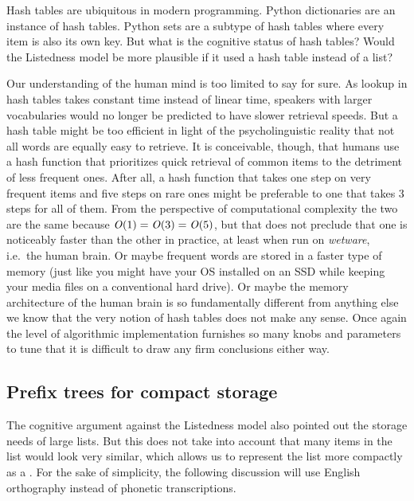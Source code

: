 \begin{programming}
Hash tables are ubiquitous in modern programming.
Python dictionaries are an instance of hash tables.
Python sets are a subtype of hash tables where every item is also its own key.
But what is the cognitive status of hash tables?
Would the Listedness model be more plausible if it used a hash table instead of a list?

Our understanding of the human mind is too limited to say for sure.
As lookup in hash tables takes constant time instead of linear time, speakers with larger vocabularies would no longer be predicted to have slower retrieval speeds.
But a hash table might be too efficient in light of the psycholinguistic reality that not all words are equally easy to retrieve.
It is conceivable, though, that humans use a hash function that prioritizes quick retrieval of common items to the detriment of less frequent ones.
After all, a hash function that takes one step on very frequent items and five steps on rare ones might be preferable to one that takes 3 steps for all of them.
From the perspective of computational complexity the two are the same because $\mathit{O}(1) = \mathit{O}(3) = \mathit{O}(5)$, but that does not preclude that one is noticeably faster than the other in practice, at least when run on \emph{wetware}, i.e.\ the human brain.
Or maybe frequent words are stored in a faster type of memory (just like you might have your OS installed on an SSD while keeping your media files on a conventional hard drive).
Or maybe the memory architecture of the human brain is so fundamentally different from anything else we know that the very notion of hash tables does not make any sense.
Once again the level of algorithmic implementation furnishes so many knobs and parameters to tune that it is difficult to draw any firm conclusions either way.


\subsection{Prefix trees for compact storage}
\label{ssec:listphonology_code_prefixtrees}

The cognitive argument against the Listedness model also pointed out the storage needs of large lists.
But this does not take into account that many items in the list would look very similar, which allows us to represent the list more compactly as a .
For the sake of simplicity, the following discussion will use English orthography instead of phonetic transcriptions.


\end{programming}
